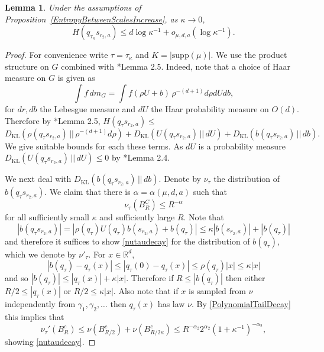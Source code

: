 \documentclass[10pt, english,oneside,reqno]{amsart}
\theoremstyle{plain}
\newtheorem{lemma}[theorem]{Lemma}
\theoremstyle{remark}
\numberwithin{equation}{section}
\numberwithin{figure}{section}
\newcommand{\R}{\mathbb{R}}
\newcommand{\Haarof}[1]{m_{#1}}
\begin{document}
\begin{lemma}\label{EntScaleGrowth2}
    Under the assumptions of Proposition~\ref{EntropyBetweenScalesIncrease}, as $\kappa \to 0$,  $$H(q_{\tau_{\kappa}} s_{r_2,a}) \leq d \log \kappa^{-1} + o_{\mu,d,a}(\log \kappa^{-1}).$$ 
\end{lemma}

\begin{proof}
    For convenience write $\tau = \tau_{\kappa}$ and $K = |\mathrm{supp}(\mu)|$. We use the product structure on $G$ combined with \cite{KittleKoglerEntropy}*{Lemma 2.5}. Indeed, note that a choice of Haar measure on $G$ is given as $$\int f \, d\Haarof{G} = \int f(\rho U + b) \, \rho^{-(d+1)}  d\rho dU db,$$ for $dr, db$ the Lebesgue measure and $dU$ the Haar probability measure on $O(d)$. Therefore by \cite{KittleKoglerEntropy}*{Lemma 2.5}, $H(q_{\tau} s_{r_2,a}) \leq $ $$D_{\mathrm{KL}}(\rho(q_{\tau} s_{r_2,a})\, || \, \rho^{-(d + 1)}d\rho) + D_{\mathrm{KL}}(U(q_{\tau} s_{r_2,a})\, || \, dU) + D_{\mathrm{KL}}(b(q_{\tau} s_{r_2,a})\, || \, db).$$ We give suitable bounds for each these terms. As $dU$ is a probability measure $D_{\mathrm{KL}}(U(q_{\tau} s_{r_2,a})\, || \, dU) \leq 0$ by \cite{KittleKoglerEntropy}*{Lemma 2.4}. 

    We next deal with $D_{\mathrm{KL}}(b(q_{\tau} s_{r_2,a})\, || \, db)$. Denote by $\nu_{\tau}$ the distribution of $b(q_{\tau} s_{r_2,a})$. We claim that there is $\alpha = \alpha(\mu,d,a)$ such that 
    \begin{equation}\label{nutaudecay}
        \nu_{\tau}(B_R^C) \leq R^{-\alpha}
    \end{equation}
    for all sufficiently small $\kappa$ and sufficiently large $R$. Note that $$|b(q_{\tau} s_{r_2,a})| = |\rho(q_{\tau})U(q_{\tau})b(s_{r_2,a}) + b(q_{\tau})| \leq \kappa |b(s_{r_2,a})| + |b(q_{\tau})|$$ and therefore it suffices to show \eqref{nutaudecay} for the distribution of $b(q_{\tau})$, which we denote by $\nu'_{\tau}$. For $x \in \R^d$, $$|b(q_{\tau}) - q_{\tau}(x)| \leq |q_{\tau}(0) - q_{\tau}(x)| \leq \rho(q_{\tau})|x| \leq \kappa|x|$$ and so $|b(q_{\tau})| \leq |q_{\tau}(x)| + \kappa|x|$. Therefore if $R\leq |b(q_{\tau})|$ then either $R/2 \leq |q_{\tau}(x)|$ or $R/2 \leq \kappa|x|$. Also note that if $x$ is sampled from $\nu$ independently from $\gamma_1, \gamma_2,\ldots$ then $q_{\tau}(x)$ has law $\nu$. By \eqref{PolynomialTailDecay} this implies that $$\nu_{\tau}'(B_R^c) \leq \nu(B_{R/2}^c) + \nu(B_{R/2\kappa}^c) \leq R^{-\alpha_2}2^{\alpha_2}(1 + \kappa^{-1})^{-\alpha_2},$$ showing \eqref{nutaudecay}.


\end{proof}
\end{document}
